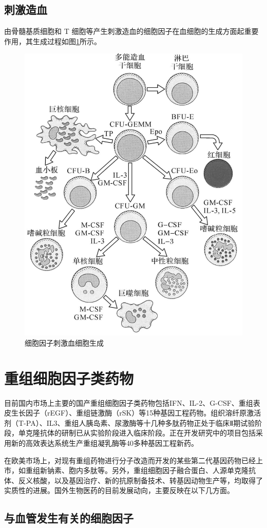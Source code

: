 \subsection{刺激造血}

由骨髓基质细胞和 T
细胞等产生刺激造血的细胞因子在血细胞的生成方面起重要作用，其生成过程如图\ref{fig6-10}所示。

\begin{figure}[!htbp]
 \centering
 \includegraphics[width=.5\textwidth]{./images/Image00100.jpg}
 \captionsetup{justification=centering}
 \caption{细胞因子刺激血细胞生成}
 \label{fig6-10}
  \end{figure} 

\section{重组细胞因子类药物}

目前国内市场上主要的国产重组细胞因子类药物包括IFN、IL-2、G-CSF、重组表皮生长因子（rEGF）、重组链激酶（rSK）等15种基因工程药物。组织溶纤原激活剂（T-PA）、IL3、重组人胰岛素、尿激酶等十几种多肽药物正处于临床Ⅱ期试验阶段，单克隆抗体的研制已从实验阶段进入临床阶段。正在开发研究中的项目包括采用新的高效表达系统生产重组凝乳酶等40多种基因工程新药。

在欧美市场上，对现有重组药物进行分子改造而开发的某些第二代基因药物已经上市，如重组新钠素、胞内多肽等。另外，重组细胞因子融合蛋白、人源单克隆抗体、反义核酸，以及基因治疗、新的抗原制备技术、转基因动物生产等，均取得了实质性的进展。国外生物医药的目前发展动向，主要反映在以下几方面。


\subsection{与血管发生有关的细胞因子}

